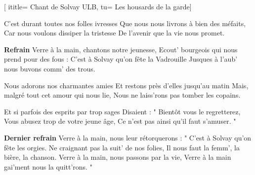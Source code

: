  [
ititle= {Chant de Solvay ULB},
tu= {Les housards de la garde}]

\beginverse
C'est durant toutes nos folles ivresses
Que nous nous livrons à bien des méfaits,
Car nous voulons dissiper la tristesse
De l'avenir que la vie nous promet.
\endverse

\beginchorus
\textbf {Refrain}
Verre à la main, chantons notre jeunesse,
Ecout' bourgeois qui nous prend pour des fous :
C'est à Solvay qu'on fête la Vadrouille
Jusques à l'aub' nous buvons comm' des trous.
\endchorus

\beginverse
Nous adorons nos charmantes amies
Et restons près d'elles jusqu'au matin
Mais, malgré tout cet amour qui nous lie,
Nous ne laiss'rons pas tomber les copains.
\endverse

\beginverse
Et si parfois des esprits par trop sages
Disaient : " Bientôt vous le regretterez,
Vous abusez trop de votre jeune âge,
Ce n'est pas ainsi qu'il faut s'amuser. "
\endverse

\beginchorus
\textbf {Dernier refrain}
Verre à la main, nous leur rétorquerons :
" C'est à Solvay qu'on fête les orgies.
Ne craignant pas la suit' de nos folies,
Il nous faut la femm', la bière, la chanson.
Verre à la main, nous passons par la vie,
Verre à la main gai'ment nous la quitt'rons. "
\endchorus

\endsong
